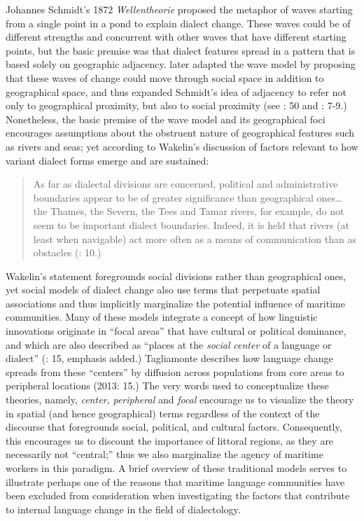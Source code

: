 Johannes Schmidt’s 1872 \textit{Wellentheorie} proposed the metaphor of waves starting from a single point in a pond to explain dialect change. These waves could be of different strengths and concurrent with other waves that have different starting points, but the basic premise was that dialect features spread in a pattern that is based solely on geographic adjacency. \citet{BaileyEtAl1993} later adapted the wave model by proposing that these waves of change could move through social space in addition to geographical space, and thus expanded Schmidt’s idea of adjacency to refer not only to geographical proximity, but also to social proximity (see \citealt{Petyt1980}: 50 and \citealt{AuerEtAl2005}: 7-9.) Nonetheless, the basic premise of the wave model and its geographical foci encourages assumptions about the obstruent nature of geographical features such as rivers and seas; yet according to Wakelin’s discussion of factors relevant to how variant dialect forms emerge and are sustained: 

\begin{quotation}
As far as dialectal divisions are concerned, political and administrative boundaries appear to be of greater significance than geographical ones… the Thames, the Severn, the Tees and Tamar rivers, for example, do not seem to be important dialect boundaries. Indeed, it is held that rivers (at least when navigable) act more often as a means of communication than as obstacles (\citealt{Wakelin1977}: 10.)\end{quotation}

Wakelin’s statement foregrounds social divisions rather than geographical ones, yet social models of dialect change also use terms that perpetuate spatial associations and thus implicitly marginalize the potential influence of maritime communities. Many of these models integrate a concept of how linguistic innovations originate in “focal areas” that have cultural or political dominance, and which are also described as “places at the \textit{social} \textit{center} of a language or dialect” (\citealt{Tagliamonte2013}: 15, emphasis added.) Tagliamonte describes how language change spreads from these “centers” by diffusion across populations from core areas to peripheral locations (2013: 15.) The very words used to conceptualize these theories, namely, \textit{center,} \textit{peripheral} and \textit{focal} encourage us to visualize the theory in spatial (and hence geographical) terms regardless of the context of the discourse that foregrounds social, political, and cultural factors. Consequently, this encourages us to discount the importance of littoral regions, as they are necessarily not “central;” thus we also marginalize the agency of maritime workers in this paradigm. A brief overview of these traditional models serves to illustrate perhaps one of the reasons that maritime language communities have been excluded from consideration when investigating the factors that contribute to internal language change in the field of dialectology. 

